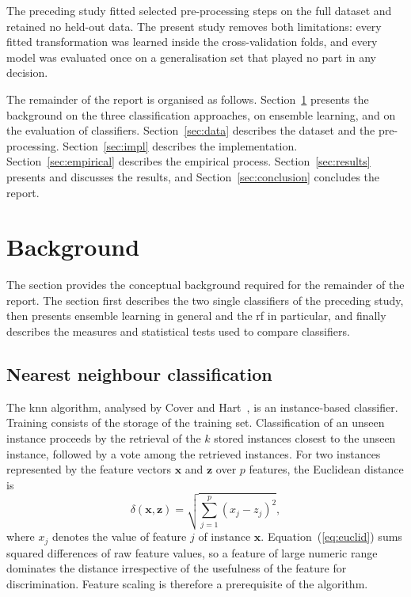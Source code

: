 The preceding study fitted selected pre-processing steps on the full
dataset and retained no held-out data. The present study removes both
limitations: every fitted transformation was learned inside the
cross-validation folds, and every model was evaluated once on a
generalisation set that played no part in any decision.

The remainder of the report is organised as follows.
Section~\ref{sec:background} presents the background on the three
classification approaches, on ensemble learning, and on the evaluation of
classifiers. Section~\ref{sec:data} describes the dataset and the
pre-processing. Section~\ref{sec:impl} describes the implementation.
Section~\ref{sec:empirical} describes the empirical process.
Section~\ref{sec:results} presents and discusses the results, and
Section~\ref{sec:conclusion} concludes the report.

\section{Background}
\label{sec:background}

The section provides the conceptual background required for the remainder of
the report. The section first describes the two single classifiers of the
preceding study, then presents ensemble learning in general and the
\gls{rf} in particular, and finally describes the measures and statistical
tests used to compare classifiers.

\subsection{Nearest neighbour classification}
\label{sec:bg-knn}

The \gls{knn} algorithm, analysed by Cover and Hart~\cite{cover1967}, is an
instance-based classifier. Training consists of the storage of the training
set. Classification of an unseen instance proceeds by the retrieval of the
$k$ stored instances closest to the unseen instance, followed by a vote among
the retrieved instances. For two instances represented by the feature vectors
$\mathbf{x}$ and $\mathbf{z}$ over $p$ features, the Euclidean distance is
\begin{equation}
\delta(\mathbf{x}, \mathbf{z}) = \sqrt{\sum_{j=1}^{p} (x_j - z_j)^2},
\label{eq:euclid}
\end{equation}
where $x_j$ denotes the value of feature $j$ of instance $\mathbf{x}$.
Equation~(\ref{eq:euclid}) sums squared differences of raw feature values,
so a feature of large numeric range dominates the distance irrespective of
the usefulness of the feature for discrimination. Feature scaling is
therefore a prerequisite of the algorithm.

